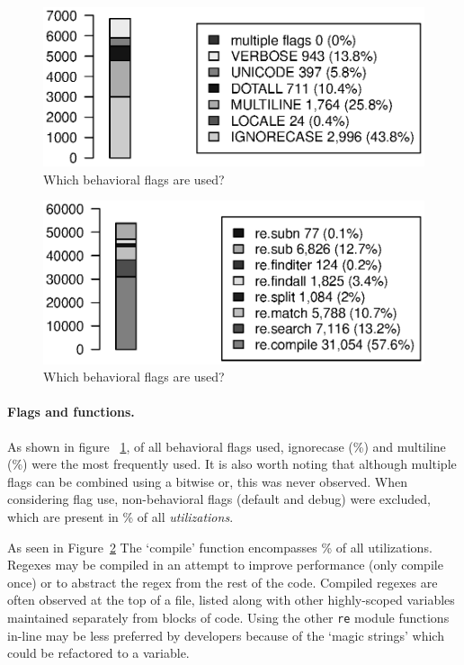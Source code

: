\begin{figure}[ht]
\centering
  \centering
  \includegraphics[width=.72\textwidth]{nontex/illustrations/partFlags.eps}
  \caption{Which behavioral flags are used?}
  \vspace{-6pt}
\label{fig:partFlags}
\end{figure}

\begin{figure}[ht]
\centering
  \centering
  \includegraphics[width=.70\textwidth]{nontex/illustrations/partFunctions.eps}
  \caption{Which behavioral flags are used?}
  \vspace{-6pt}
\label{fig:partFunctions}
\end{figure}

\paragraph{Flags and functions.}
\label{sec:flagsAndFunctions} As shown in figure ~\ref{fig:partFlags}, of all behavioral flags used, ignorecase (\%) and multiline (\%) were the most frequently used.  It is also worth noting that although multiple flags can be combined using a bitwise or, this was never observed.
When considering flag use, non-behavioral flags (default and debug) were excluded, which are present in \% of all \emph{utilizations}.

As seen in Figure~\ref{fig:partFunctions} The `compile' function encompasses \% of all utilizations.  Regexes may be compiled in an attempt to improve performance (only compile once) or to abstract the regex from the rest of the code.  Compiled regexes are often observed at the top of a file, listed along with other highly-scoped variables maintained separately from blocks of code.  Using the other {\tt re} module functions in-line may be less preferred by developers because of the `magic strings' which could be refactored to a variable.
\pagebreak
